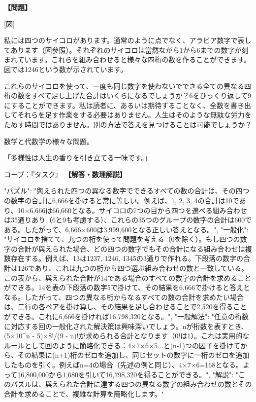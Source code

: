 \documentclass[10pt,a4paper,oneside,openany]{ltjsbook}
\begin{document}
\begin{tcolorbox}[colback=softblue,colframe=primaryblue,title=\textbf{第 96 問：THE DICE NUMBERS.},arc=2mm,boxrule=1pt,breakable]
\textbf{【問題】}\par\vspace{0.3em}

[図]

私には四つのサイコロがあります。通常のように点でなく、アラビア数字で表してあります（図參照）。それぞれのサイコロは當然ながら1から6までの数字が刻まれています。これらを組み合わせると様々な四桁の数を作ることができます。図では1246という数が示されています。

これらのサイコロを使って、一度も同じ数字を使わないでできる全ての異なる四桁の数をすべて足し上げた合計はいくらになるでしょうか？6をひっくり返して9にすることができます。私は読者に、あるいは期待することなく、全数を書き出してそれらを足す作業をする必要はありません。人生はそのような無駄な労力をためす時間ではありません。別の方法で答えを見つけることは可能でしょうか？

数学と代数学の様々な問題。

「多様性は人生の香りを引き立てる一味です。」

コープ：『タスク』
\tcblower
\textbf{【解答・数理解説】}\par\vspace{0.3em}
{
    "パズル": "與えられた四つの異なる数字でできるすべての数の合計は、その四つの数字の合計に6,666を掛けると常に等しい。例えば、1, 2, 3, 4の合計は10であり、10×6,666は66,660となる。サイコロの7つの目から四つを選べる組み合わせは35通りあり（6と9も考慮する）、これらの35つのグループの数字の合計は600である。したがって、6,666×600は3,999,600となる正しい答えとなる。",
    "一般化": "サイコロを捨てて、九つの桁を使って問題を考える（0を除く）。もし四つの数字の合計が與えられた場合、どの四つの数字でもその合計になる組み合わせは複数存在する。例えば、13は1237, 1246, 1345の3通りで作れる。下段落の数字の合計は126であり、これは九つの桁から四つ選ぶ組み合わせの数と一致している。この表から、與えられた合計が14である場合のすべての数字の合計を求めることができる。14を表の下段落の数字5で掛けて、その結果を6,666で掛けると答えとなる。したがって、四つの異なる桁からなるすべての数の合計を求めたい場合は、二行の各ペアを掛け算し、その結果を足し合わせることで2,520を得ることができる。これに6,666を掛ければ16,798,320となる。",
    "一般解法": "任意の桁数に対応する回の一般化された解決策は興味深いでしょう。nが桁数を表すとき、(5×10\textasciicircum{}n - 5)×8!/(9 - n)!が求められる合計となります（0!は1）。これは実用的なルールとして回のように簡略化できる：4×7×6×5...と(n-1)つの因子を掛けてから、その結果に(n+1)桁のゼロを追加し、同じセットの数字に一桁のゼロを追加したものを引く。例えばn=4の場合（先述の例と同じ）、4×7×6=168となる。よって16,800,000から1,680を引いて16,798,320を得ることができる。",
    "解説": "このパズルは、與えられた合計に達する四つの異なる数字の組み合わせの数とその合計を求めることで、複雑な計算を簡略化します。"
}
\end{tcolorbox}
\end{document}
